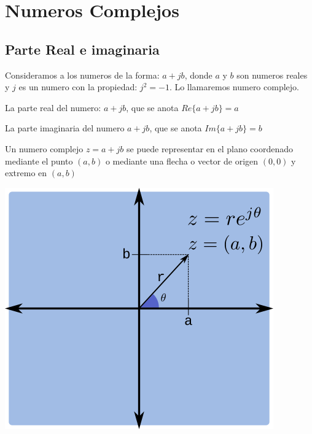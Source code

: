 %
%
%
% 
% 
%
\section{Numeros Complejos}
   \subsection{Parte Real e imaginaria}
\begin{defi}
Consideramos a los numeros de la forma: $a+jb$, donde $a$ y $b$ son numeros reales y $j$ es un numero con la propiedad: $j^{2}=-1$. Lo llamaremos numero complejo.
\end{defi}

\begin{ejemplo}
La parte real del numero: $a+jb$, que se anota $Re\{a+jb\}=a$

La parte imaginaria del numero $a+jb$, que se anota $Im\{a+jb\}=b$
\end{ejemplo}
\begin{defi}
   Un numero complejo $z=a+jb$ se puede representar en el plano coordenado mediante el punto $(a, b)$ o mediante una flecha o vector de origen $(0, 0)$ y extremo en $(a, b)$
\end{defi}

\includegraphics[width=.17\textwidth]{../Algebra/Images/complex_numbers.png}
